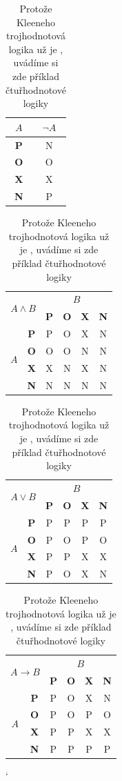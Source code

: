 \documentclass[a4paper,11pt,final]{article}
\begin{document}
	\begin{table}[h]
	\centering
	\begin{tabular}{|c|c|}
		\hline
		$A$ & $\neg A$\\
		\hline
		\textbf P & N \\
		\textbf O & O \\
		\textbf X & X \\
		\textbf N & P \\
		\hline	
	\end{tabular} 
	\begin{tabular}{|c|c|c|c|c|c|}
		\hline
		\multicolumn{2}{|c|}{\multirow{2}{*}{$A \wedge B$}} & \multicolumn{4}{c|}{$B$}\\
		\cline{3-6}
		\multicolumn{1}{|c}{ } &  & \textbf P & \textbf O & \textbf X & \textbf N \\
		\hline 	
		\multirow{4}{*}{$A$} & \textbf P & P & O & X & N \\
		\cline{2-6}
		& \textbf O & O & O & N & N \\
		\cline{2-6}
		& \textbf X & X & N & X & N \\
		\cline{2-6}
		& \textbf N & N & N & N & N \\
		\hline
	\end{tabular}
	\begin{tabular}{|c|c|c|c|c|c|}
		\hline
		\multicolumn{2}{|c|}{\multirow{2}{*}{$A \vee B$}} & \multicolumn{4}{c|}{$B$}\\
		\cline{3-6}
		\multicolumn{1}{|c}{ } &  & \textbf P & \textbf O & \textbf X & \textbf N \\
		\hline 	
		\multirow{4}{*}{$A$} & \textbf P & P & P & P & P \\
		\cline{2-6}
		& \textbf O & P & O & P & O \\
		\cline{2-6}
		& \textbf X & P & P & X & X \\
		\cline{2-6}
		& \textbf N & P & O & X & N \\
		\hline
	\end{tabular}
	\begin{tabular}{|c|c|c|c|c|c|}
		\hline
		\multicolumn{2}{|c|}{\multirow{2}{*}{$A \rightarrow B$}} & \multicolumn{4}{c|}{$B$}\\
		\cline{3-6}
		\multicolumn{1}{|c}{ } &  & \textbf P & \textbf O & \textbf X & \textbf N \\
		\hline 	
		\multirow{4}{*}{$A$} & \textbf P & P & O & X & N \\
		\cline{2-6}
		& \textbf O & P & O & P & O \\
		\cline{2-6}
		& \textbf X & P & P & X & X \\
		\cline{2-6}
		& \textbf N & P & P & P & P \\
		\hline
\end{tabular}
	\caption{Protože Kleeneho trojhodnotová logika už je , uvádíme si zde příklad čtuřhodnotové logiky}
	\label{logic}
\end{table}
\catcode` 	
\end{document}
